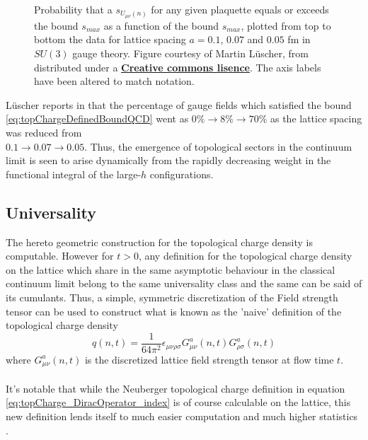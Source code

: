 \documentclass[a4paper,10pt]{book}
\begin{document}
\begin{figure}
\centering
{}


\caption[Smoothness bounds on lattice gauge fields]{Probability that a $s_{U_{\mu \nu}(n)}$ for any given plaquette equals or exceeds the bound $s_{max}$ as a function of the bound $s_{max}$, plotted from top to bottom the data for lattice spacing $a=0.1,\,0.07$ and $0.05$ fm in $SU(3)$ gauge theory. Figure courtesy of Martin Lüscher, from \cite{Luscher2010} distributed under a \href{https://creativecommons.org/licenses/by/4.0/}{\textbf{Creative commons lisence}}. The axis labels have been altered to match notation.}\label{fig:latticeSpacingexceedingBound}
\end{figure}
Lüscher reports in \cite{Luscher2010} that the percentage of gauge fields which satisfied the bound \eqref{eq:topChargeDefinedBoundQCD} went as
$0\%\rightarrow 8\%\rightarrow 70\%$ as the lattice spacing was reduced from\\$0.1\rightarrow0.07\rightarrow0.05$.
Thus, the emergence of topological sectors in the continuum limit is seen to arise dynamically from the rapidly decreasing weight in the functional integral of the large-$h$ configurations.
\subsection{Universality}\label{sec:universalityOfQdefs}
The hereto geometric construction for the topological charge density is computable. However for $t>0$, any definition for the topological charge density on the lattice which share in the same asymptotic behaviour in the classical continuum limit belong to the same universality class \cite{Luscher2010}\cite{L_scher_2011} and the same can be said of its cumulants. Thus, a simple, symmetric discretization of the Field strength tensor can be used to construct what is known as the 'naive' definition of the topological charge density 
\begin{equation}\label{eq:topChargeDensity_flowed_lattice}
q(n, t)=\frac{1}{64 \pi^{2}} \epsilon_{\mu \nu \rho \sigma} G_{\mu \nu}^{a}(n, t) G_{\rho \sigma}^{a}(n, t)
\end{equation}
where $G_{\mu \nu}^{a}(n, t)$ is the discretized lattice field strength tensor at flow time $t$.\\\\It's notable that while the Neuberger topological charge definition in equation \eqref{eq:topCharge_DiracOperator_index} is of course calculable on the lattice, this new definition lends itself to much easier computation and much higher statistics \cite{PhysRevLett.94.032003}\cite{non_gaussianities2015}.
\end{document}
